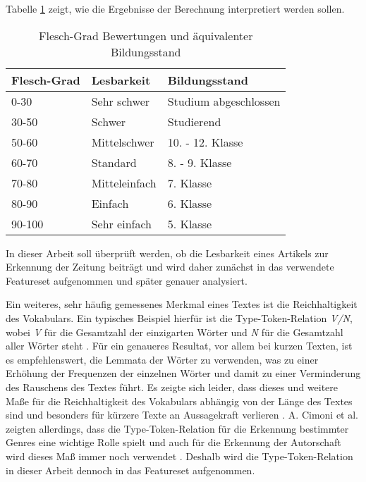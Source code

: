 Tabelle \ref{table.fleschgrad} zeigt, wie die Ergebnisse der Berechnung interpretiert werden sollen.

\begin{table}[h]
\centering
\begin{spacing}{1.25}
\begin{tabular}[t]{lll}
\toprule
Flesch-Grad & Lesbarkeit & Bildungsstand\\
\midrule
0-30 & Sehr schwer & Studium abgeschlossen\\
30-50 & Schwer & Studierend\\
50-60 & Mittelschwer & 10. - 12. Klasse\\
60-70 & Standard & 8. - 9. Klasse\\
70-80 & Mitteleinfach & 7. Klasse\\
80-90 & Einfach & 6. Klasse\\
90-100 & Sehr einfach & 5. Klasse\\
\bottomrule
\end{tabular}
\caption{Flesch-Grad Bewertungen und äquivalenter Bildungsstand \cite[S.~406]{courtis2002reading}}
\label{table.fleschgrad}
\end{spacing}
\end{table}

In dieser Arbeit soll überprüft werden, ob die Lesbarkeit eines Artikels zur Erkennung der Zeitung beiträgt und wird daher zunächst in das verwendete Featureset aufgenommen und später genauer analysiert.

Ein weiteres, sehr häufig gemessenes Merkmal eines Textes ist die Reichhaltigkeit des Vokabulars. Ein typisches Beispiel hierfür ist die Type-Token-Relation \textit{V/N}, wobei \textit{V} für die Gesamtzahl der einzigarten Wörter und \textit{N} für die Gesamtzahl aller Wörter steht \cite[S.~540]{stamatatos2009survey}. Für ein genaueres Resultat, vor allem bei kurzen Texten, ist es empfehlenswert, die Lemmata der Wörter zu verwenden, was zu einer Erhöhung der Frequenzen der einzelnen Wörter und damit zu einer Verminderung des Rauschens des Textes führt. Es zeigte sich leider, dass dieses und weitere Maße für die Reichhaltigkeit des Vokabulars abhängig von der Länge des Textes sind und besonders für kürzere Texte an Aussagekraft verlieren \cite{tweedie1998variable}. A. Cimoni et al. zeigten allerdings, dass die Type-Token-Relation für die Erkennung bestimmter Genres eine wichtige Rolle spielt \cite[S.~5]{cimino2017identifying} und auch für die Erkennung der Autorschaft wird dieses Maß immer noch verwendet \cite[S.~540]{stamatatos2009survey}. Deshalb wird die Type-Token-Relation in dieser Arbeit dennoch in das Featureset aufgenommen.

